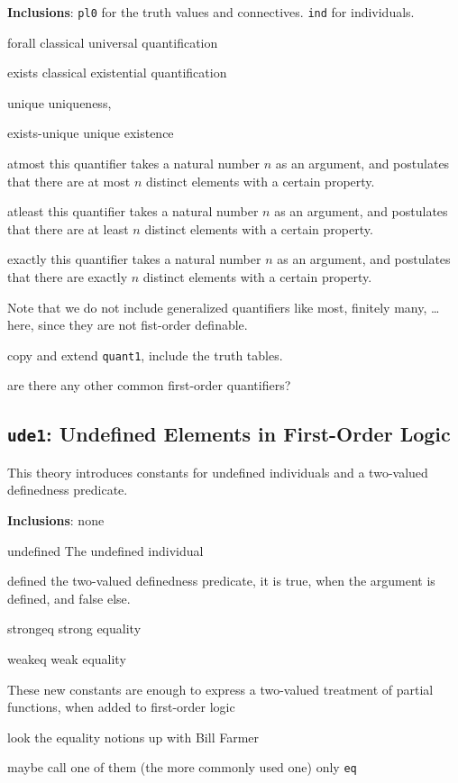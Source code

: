 \documentclass{article}
\begin{document}
{\bf Inclusions}: {\tt{pl0}} for the truth values and connectives. {\tt{ind}} for individuals.
\begin{constlist}
  \item[forall] classical universal quantification
  \item[exists] classical existential quantification
  \item[unique] uniqueness, 
  \item[exists-unique] unique existence
  \item[atmost] this quantifier takes a natural number $n$ as an argument, and
    postulates that there are at most $n$ distinct elements with a certain property.
  \item[atleast] this quantifier takes a natural number $n$ as an argument, and
    postulates that there are at least $n$ distinct elements with a certain property.
  \item[exactly] this quantifier takes a natural number $n$ as an argument, and
    postulates that there are exactly $n$ distinct elements with a certain property.
\end{constlist}
Note that we do not include generalized quantifiers like most, finitely many,
\ldots here, since they are not fist-order definable. 
\begin{todolist}{}
  \item copy and extend {\tt{quant1}}, include the truth tables.
  \item are there any other common first-order quantifiers?
\end{todolist}

\subsection{{\tt{ude1}}: Undefined Elements in First-Order Logic}
This theory introduces constants for  undefined individuals and a two-valued
definedness predicate.

{\bf Inclusions}: none
\begin{constlist}
  \item[undefined] The undefined individual
  \item[defined] the two-valued definedness predicate, it is true, when the
    argument is defined, and false else.
  \item[strongeq] strong equality
  \item[weakeq] weak equality
\end{constlist}
These new constants are enough to express a two-valued treatment of partial
functions, when added to first-order logic
\begin{todolist}{}
  \item look the equality notions up with Bill Farmer
  \item maybe call one of them (the more commonly used one) only {\tt{eq}}
\end{todolist}
\end{document}
